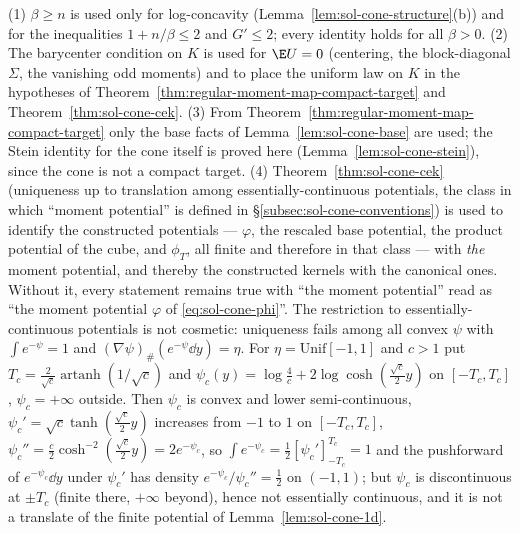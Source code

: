 \documentclass[../main.tex]{subfiles}
\begin{document}
\begin{remark}
\label{rem:sol-cone-hypotheses}
(1) $\beta\ge n$ is used only for log-concavity (Lemma~\ref{lem:sol-cone-structure}(b)) and for
the inequalities $1+n/\beta\le2$ and $G'\le2$; every identity holds for all $\beta>0$.
(2) The barycenter condition on $K$ is used for $\E U=0$ (centering, the block-diagonal
$\Sigma$, the vanishing odd moments) and to place the uniform law on $K$ in the hypotheses of
Theorem~\ref{thm:regular-moment-map-compact-target} and Theorem~\ref{thm:sol-cone-cek}.
(3) From Theorem~\ref{thm:regular-moment-map-compact-target} only the base facts of
Lemma~\ref{lem:sol-cone-base} are used; the Stein identity for the cone itself is proved here
(Lemma~\ref{lem:sol-cone-stein}), since the cone is not a compact target.
(4) Theorem~\ref{thm:sol-cone-cek} (uniqueness up to translation among essentially-continuous
potentials, the class in which ``moment potential'' is defined in
\S\ref{subsec:sol-cone-conventions}) is used to identify the constructed potentials ---
$\varphi$, the rescaled base potential, the product potential of the cube, and $\phi_T$, all
finite and therefore in that class --- with \emph{the} moment potential, and thereby the
constructed kernels with the canonical ones.  Without it, every statement remains true with
``the moment potential'' read as ``the moment potential $\varphi$ of \eqref{eq:sol-cone-phi}''.
The restriction to essentially-continuous potentials is not cosmetic: uniqueness fails among
all convex $\psi$ with $\int e^{-\psi}=1$ and $(\nabla\psi)_\#(e^{-\psi}\dd y)=\eta$.  For
$\eta=\mathrm{Unif}[-1,1]$ and $c>1$ put $T_c=\tfrac2{\sqrt c}\operatorname{artanh}(1/\sqrt c)$
and $\psi_c(y)=\log\tfrac4c+2\log\cosh(\tfrac{\sqrt c}2y)$ on $[-T_c,T_c]$, $\psi_c=+\infty$
outside.  Then $\psi_c$ is convex and lower semi-continuous, $\psi_c'=\sqrt c\tanh(\tfrac{\sqrt c}2y)$
increases from $-1$ to $1$ on $[-T_c,T_c]$, $\psi_c''=\tfrac c2\cosh^{-2}(\tfrac{\sqrt c}2y)=2e^{-\psi_c}$,
so $\int e^{-\psi_c}=\tfrac12[\psi_c']_{-T_c}^{T_c}=1$ and the pushforward of $e^{-\psi_c}\dd y$
under $\psi_c'$ has density $e^{-\psi_c}/\psi_c''=\tfrac12$ on $(-1,1)$; but $\psi_c$ is
discontinuous at $\pm T_c$ (finite there, $+\infty$ beyond), hence not essentially
continuous, and it is not a translate of the finite potential of Lemma~\ref{lem:sol-cone-1d}.
\end{remark}
\end{document}
